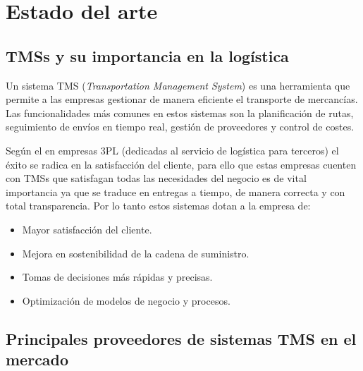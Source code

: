 \chapter{Estado del arte}

\section{TMSs y su importancia en la logística} 
Un sistema TMS (\textit{Transportation Management System}) es una herramienta que permite a las empresas gestionar de manera eficiente el transporte de mercancías. Las funcionalidades más comunes en estos sistemas son
la planificación de rutas, seguimiento de envíos en tiempo real, gestión de proveedores y control de costes. \textcite{comparativaSistemasTMS}

Según el \textcite{keyAttributesChallengesAndSuccessFactors}  en empresas 3PL (dedicadas al servicio de logística para terceros) el éxito se radica en la satisfacción del cliente, para ello que estas empresas cuenten con TMSs que satisfagan todas las necesidades del negocio es de vital importancia ya que se traduce en entregas a tiempo, de manera correcta y con total transparencia. Por lo tanto estos sistemas dotan a la empresa de:
\begin{itemize}
    \item Mayor satisfacción del cliente.
    \item Mejora en sostenibilidad de la cadena de suministro.
    \item Tomas de decisiones más rápidas y precisas.
    \item Optimización de modelos de negocio y procesos.
\end{itemize}

\section{Principales proveedores de sistemas TMS en el mercado}

